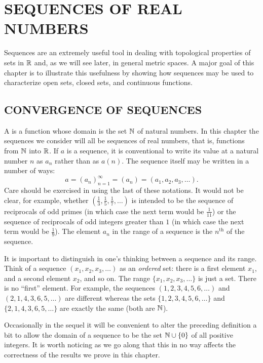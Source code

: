 \chapter{SEQUENCES OF REAL NUMBERS}\label{seqs_rn}

Sequences are an extremely useful tool in dealing with topological properties of sets in $\mathbb{R}$
and, as we will see later, in general metric spaces.  A major goal of this chapter is to
illustrate this usefulness by showing how sequences may be used to characterize open sets,
closed sets, and continuous functions.



\section{CONVERGENCE OF SEQUENCES}

A
 is a function whose domain is the set $\mathbb{N}$ of natural numbers.  In this chapter
the sequences we consider will all be sequences of real numbers, that is, functions from $\mathbb{N}$
into $\mathbb{R}$. If $a$ is a sequence, it is conventional to write its value at a natural number $n$
as $a_n$ rather than as $a(n)$. The sequence itself may be written in a number of ways:
   \[a = (a_n)_{n=1}^\infty = (a_n) = (a_1,a_2,a_3, \dots).\]
Care should be exercised in using the last of these notations.  It would not be clear, for
example, whether $(\frac13,\frac15,\frac17,\dots)$ is intended to be the sequence of
reciprocals of odd primes (in which case the next term would be $\frac1{11}$) or the sequence
of reciprocals of odd integers greater than $1$ (in which case the next term would be
$\frac19$). The element $a_n$ in the range of a sequence is the $n^{\text{th}}$
 of the sequence.

It is important to distinguish in one's thinking between a sequence and its range.  Think of a
sequence $(x_1,x_2,x_3,\dots)$ as an \emph{ordered} set: there is a first element $x_1$, and a
second element $x_2$, and so on.  The range $\{x_1,x_2,x_3,\dots\}$ is just a set.  There is
no ``first'' element.  For example, the sequences $(1,2,3,4,5,6,\dots)$ and
$(2,1,4,3,6,5,\dots)$ are different whereas the sets $\{1,2,3,4,5,6,\dots\}$ and
$\{2,1,4,3,6,5,\dots\}$ are exactly the same (both are $\mathbb{N}$).

\begin{rem} Occasionally in the sequel it will be convenient to alter the preceding definition
a bit to allow the domain of a sequence to be the set $\mathbb{N} \cup \{0\}$ of all positive
integers. It is worth noticing as we go along that this in no way affects the correctness of
the results we prove in this chapter.
\end{rem}

